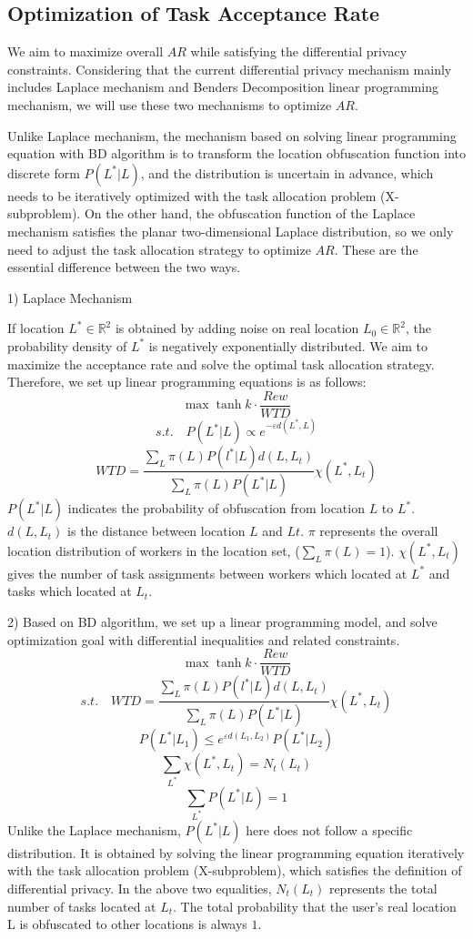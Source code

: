 \subsection{Optimization of Task Acceptance Rate}
We aim to maximize overall $AR$ while satisfying the differential privacy constraints. Considering that the current differential privacy mechanism mainly includes Laplace mechanism and Benders Decomposition linear programming mechanism, we will use these two mechanisms to optimize $AR$.

Unlike Laplace mechanism, the mechanism based on solving linear programming equation with BD algorithm is to transform the location obfuscation function into discrete form $P(L^*|L)$, and the distribution is uncertain in advance, which needs to be iteratively optimized with the task allocation problem (X-subproblem). On the other hand, the obfuscation function of the Laplace mechanism satisfies the planar two-dimensional Laplace distribution, so we only need to adjust the task allocation strategy to optimize $AR$. These are the essential difference between the two ways.

1) Laplace Mechanism

If location $L^* \in \mathbb R^2$ is obtained by adding noise on real location $L_0 \in \mathbb R^2$, the probability density of $L^*$ is negatively exponentially distributed. We aim to maximize the acceptance rate and solve the optimal task allocation strategy. Therefore, we set up linear programming equations is as follows:
$$
	\max \tanh {k \cdot \frac{Rew}{WTD}}
$$
$$
	s.t. \quad P(L^*|L) \propto e^{-\varepsilon d(L^*,L)}
$$
$$
	WTD=\frac {\sum_L \pi(L) P(l^*|L) d(L,L_t)} {\sum_L \pi(L) P(L^*|L)} \chi(L^*,L_t)
$$
$P(L^*|L)$ indicates the probability of obfuscation from location $L$ to $L^*$. $d(L,L_t)$ is the distance between location $L$ and $Lt$. $\pi$ represents the overall location distribution of workers in the location set, ($\sum_L \pi(L)=1$). $\chi(L^*,L_t)$ gives the number of task assignments between workers which located at $L^*$ and tasks which located at $L_t$. 

2) Based on BD algorithm, we set up a linear programming model, and solve optimization goal with differential inequalities and related constraints.
$$
	\max \tanh {k \cdot \frac{Rew}{WTD}}
$$
$$
	s.t. \quad WTD=\frac {\sum_L \pi(L) P(l^*|L) d(L,L_t)} {\sum_L \pi(L) P(L^*|L)} \chi(L^*,L_t)
$$
$$
	P(L^*|L_1) \leq e^{\varepsilon d(L_1,L_2)} P(L^*|L_2) 
$$
$$
	\sum_{L^*} \chi(L^*,L_t)=N_t (L_t)
$$
$$
	\sum_{L^*} P(L^*|L)=1
$$
Unlike the Laplace mechanism, $P(L^*|L)$ here does not follow a specific distribution. It is obtained by solving the linear programming equation iteratively with the task allocation problem (X-subproblem), which satisfies the definition of differential privacy. In the above two equalities, $N_t (L_t)$ represents the total number of tasks located at $L_t$. The total probability that the user’s real location L is obfuscated to other locations is always $1$.

